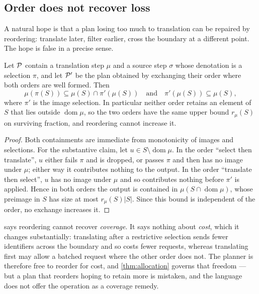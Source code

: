\subsection{Order does not recover loss}

A natural hope is that a plan losing too much to translation can be repaired by
reordering: translate later, filter earlier, cross the boundary at a different
point. The hope is false in a precise sense.

\begin{theorem}
\label{thm:reorder}
Let $\mathcal{P}$ contain a translation step $\mu$ and a source step $\sigma$ whose
denotation is a selection $\pi$, and let $\mathcal{P}'$ be the plan obtained by
exchanging their order where both orders are well formed. Then
\[
\mu(\pi(S)) \subseteq \mu(S) \cap \pi'(\mu(S))
\quad\text{and}\quad
\pi'(\mu(S)) \subseteq \mu(S),
\]
where $\pi'$ is the image selection. In particular neither order retains an
element of $S$ that lies outside $\operatorname{dom}\mu$, so the two orders
have the same upper bound $r_\mu(S)$ on surviving fraction, and reordering
cannot increase it.
\end{theorem}

\begin{proof}
Both containments are immediate from monotonicity of images and selections.
For the substantive claim, let $u \in S \setminus \operatorname{dom}\mu$. In
the order ``select then translate'', $u$ either fails $\pi$ and is dropped, or
passes $\pi$ and then has no image under $\mu$; either way it contributes
nothing to the output. In the order ``translate then select'', $u$ has no image
under $\mu$ and so contributes nothing before $\pi'$ is applied. Hence in both
orders the output is contained in $\mu(S \cap \operatorname{dom}\mu)$, whose
preimage in $S$ has size at most $r_\mu(S)|S|$. Since this bound is independent
of the order, no exchange increases it.
\end{proof}

\begin{remark}
\label{rem:reorder-cost}
 says reordering cannot recover \emph{coverage}. It says
nothing about \emph{cost}, which it changes substantially: translating after a
restrictive selection sends fewer identifiers across the boundary and so costs
fewer requests, whereas translating first may allow a batched request where the
other order does not. The planner is therefore free to reorder for cost, and
\cref{thm:allocation} governs that freedom --- but a plan that reorders hoping
to retain more is mistaken, and the language does not offer the operation as a
coverage remedy.
\end{remark}

